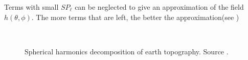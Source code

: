 Terms with small $SP_\ell$ can be neglected to give an approximation of the field $h(\theta,\phi)$. The more terms that are left, the better the approximation(see )

\begin{figure}
	\centering
	\\
	\caption{Spherical harmonics decomposition of earth topography. Source .}
	\label{fig:earth_decompo}
\end{figure}
